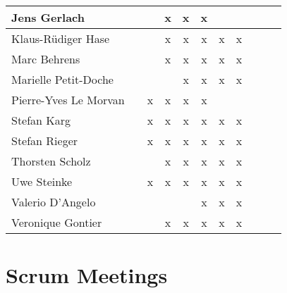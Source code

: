 \documentclass[a4paper, 11pt]{article}
\begin{document}
\begin{tabular}{|l|c|c|c|c||c|c|c||c|c|c|}
Jens Gerlach         &   &   & x & x & x &   &   \\\hline
Klaus-R\"udiger Hase &   &   & x & x & x & x & x \\\hline
Marc Behrens         &    &   & x & x & x & x & x \\\hline
Marielle Petit-Doche &   &   &   & x & x & x & x \\\hline
Pierre-Yves Le Morvan &   & x & x & x & x &   &   \\\hline
Stefan Karg          &   & x & x & x & x & x & x \\\hline
Stefan Rieger        &   & x & x & x & x & x & x \\\hline
Thorsten Scholz      &   &   & x & x & x & x & x \\\hline
Uwe Steinke          &   & x & x & x & x & x & x \\\hline
Valerio D'Angelo     &   &   &   &   & x & x & x \\\hline
Veronique Gontier    &   &   & x & x & x & x & x \\\hline
\end{tabular}


\section{Scrum Meetings}
\end{document}
